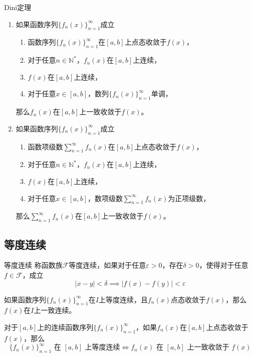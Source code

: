 \documentclass[lang = cn, scheme = chinese, thmcnt = section]{elegantbook}
\newcommand{\N}{\mathbb{N}}            %
\newcommand{\dis}{\displaystyle}
\begin{document}
\begin{theorem}{Dini定理}
	\begin{enumerate}
		\item 如果函数序列$\{f_n(x)\}_{n=1}^{\infty}$成立
		\begin{enumerate}
			\item 函数序列$\{f_n(x)\}_{n=1}^{\infty}$在$[a,b]$上点态收敛于$f(x)$，
			\item 对于任意$n\in\N^*$，$f_n(x)$在$[a,b]$上连续，
			\item $f(x)$在$[a,b]$上连续，
			\item 对于任意$x\in [a,b]$，数列$\{f_n(x)\}_{n=1}^{\infty}$单调，
		\end{enumerate}
		那么$f_n(x)$在$[a,b]$上一致收敛于$f(x)$。
		\item 如果函数序列$\{f_n(x)\}_{n=1}^{\infty}$成立
		\begin{enumerate}
			\item 函数项级数$\dis\sum_{n=1}^{\infty}f_n(x)$在$[a,b]$上点态收敛于$f(x)$，
			\item 对于任意$n\in\N^*$，$f_n(x)$在$[a,b]$上连续，
			\item $f(x)$在$[a,b]$上连续，
			\item 对于任意$x\in [a,b]$，数项级数$\dis\sum_{n=1}^{\infty}f_n(x)$为正项级数，
		\end{enumerate}
		那么$\dis\sum_{n=1}^{\infty}f_n(x)$在$[a,b]$上一致收敛于$f(x)$。
	\end{enumerate}
\end{theorem}

\subsection{等度连续}

\begin{definition}{等度连续}
	称函数族$\mathscr{F}$等度连续，如果对于任意$\varepsilon>0$，存在$\delta>0$，使得对于任意$f\in\mathscr{F}$，成立
	$$
	|x-y|<\delta\implies
	|f(x)-f(y)|<\varepsilon
	$$
\end{definition}

\begin{theorem}
	如果函数序列$\{f_n(x)\}_{n=1}^{\infty}$在$I$上等度连续，且$f_n(x)$点态收敛于$f(x)$，那么$f(x)$在$I$上一致连续。
\end{theorem}

\begin{theorem}
	对于$[a,b]$上的连续函数序列$\{f_n(x)\}_{n=1}^{\infty}$，如果$f_n(x)$在$[a,b]$上点态收敛于$f(x)$，那么
	$$
	\{f_n(x)\}_{n=1}^{\infty} \text{ 在 }[a,b]\text{ 上等度连续}
	\iff 
	f_n(x) \text{ 在 }[a,b]\text{ 上一致收敛于 }f(x)
	$$
\end{theorem}
\end{document}
